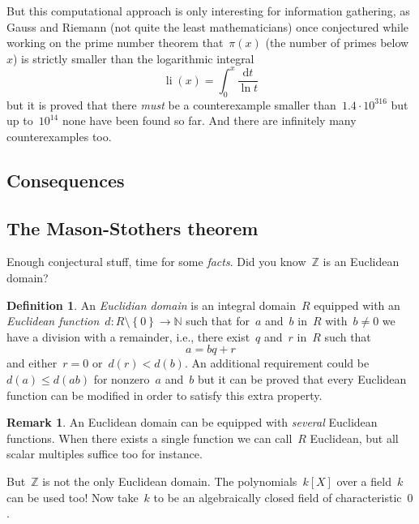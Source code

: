 \documentclass[11pt, a4paper, openany, oneside, article]{memoir}
\theoremstyle{definition}
\newtheorem{definition}[theorem]{Definition}
\newtheorem{remark}[theorem]{Remark}
\begin{document}
But this computational approach is only interesting for information gathering, as Gauss and Riemann (not quite the least mathematicians) once conjectured while working on the prime number theorem that~$\pi(x)$ (the number of primes below~$x$) is strictly smaller than the logarithmic integral
\begin{equation}
  \operatorname{li}(x)=\int_0^x\frac{\mathrm{d}t}{\ln t}
\end{equation}
but it is proved that there \emph{must} be a counterexample smaller than~$1.4\cdot10^{316}$ but up to~$10^{14}$ none have been found so far. And there are infinitely many counterexamples too.


\subsection{Consequences}



\subsection{The Mason-Stothers theorem}

Enough conjectural stuff, time for some \emph{facts}. Did you know~$\mathbb{Z}$ is an Euclidean domain?

\begin{definition}
  An \emph{Euclidian domain} is an integral domain~$R$ equipped with an \emph{Euclidean function}~$d\colon R\setminus\left\{ 0 \right\}\to\mathbb{N}$ such that for~$a$ and~$b$ in~$R$ with~$b\neq 0$ we have a division with a remainder, i.e., there exist~$q$ and~$r$ in~$R$ such that
  \begin{equation}
    a=bq+r
  \end{equation}
  and either~$r=0$ or~$d(r)<d(b)$. An additional requirement could be~$d(a)\leq d(ab)$ for nonzero~$a$ and~$b$ but it can be proved that every Euclidean function can be modified in order to satisfy this extra property.
\end{definition}

\begin{remark}
  An Euclidean domain can be equipped with \emph{several} Euclidean functions. When there exists a single function we can call~$R$ Euclidean, but all scalar multiples suffice too for instance.
\end{remark}

But~$\mathbb{Z}$ is not the only Euclidean domain. The polynomials~$k[X]$ over a field~$k$ can be used too! Now take~$k$ to be an algebraically closed field of characteristic~$0$.
\end{document}
